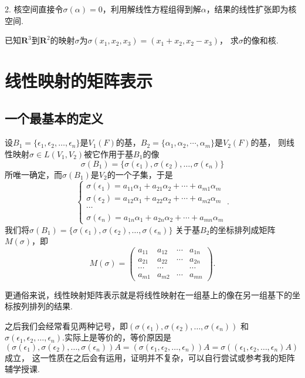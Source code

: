 2. 核空间直接令$\sigma(\alpha)=0$，利用解线性方程组得到解$\alpha$，结果的线性扩张即为核空间.
\begin{example}
	已知$\mathbf{R}^3$到$\mathbf{R}^2$的映射$\sigma$为$\sigma(x_1,x_2,x_3)=(x_1+x_2,x_2-x_3)$，
	求$\sigma$的像和核.
\end{example}

\section{线性映射的矩阵表示}
\subsection{一个最基本的定义}
\begin{definition}
	设$B_1=\{\epsilon_1,\epsilon_2,\dots,\epsilon_n\}$是$V_1(F)$的基，$B_2=\{\alpha_1,\alpha_2,\cdots,\alpha_m\}$是$V_2(F)$的基，
	则线性映射$\sigma \in L(V_1,V_2)$被它作用于基$B_1$的像
	$$\sigma(B_1)=\{\sigma(\epsilon_1),\sigma(\epsilon_2),\dots,\sigma(\epsilon_n)\}$$
	所唯一确定，而$\sigma(B_1)$是$V_2$的一个子集，于是
	$$\begin{cases}
		\sigma(\epsilon_1)=a_{11}\alpha_1+a_{21}\alpha_2+\cdots+a_{m1}\alpha_m \\
		\sigma(\epsilon_2)=a_{12}\alpha_1+a_{22}\alpha_2+\cdots+a_{m2}\alpha_m \\
		\cdots \\
		\sigma(\epsilon_n)=a_{1n}\alpha_1+a_{2n}\alpha_2+\cdots+a_{mn}\alpha_m
	\end{cases}.$$
	我们将$\sigma(B_1)=\{\sigma(\epsilon_1),\sigma(\epsilon_2),\dots,\sigma(\epsilon_n)\}$
	关于基$B_2$的坐标排列成矩阵$M(\sigma)$，即
	$$M(\sigma)=\begin{pmatrix}
		a_{11} & a_{12} & \cdots & a_{1n} \\
		a_{21} & a_{22} & \cdots & a_{2n} \\
		\cdots & \cdots &        & \cdots \\
		a_{m1} & a_{m2} & \cdots & a_{mn}
	\end{pmatrix}.$$
\end{definition}
更通俗来说，线性映射矩阵表示就是将线性映射在一组基上的像在另一组基下的坐标按列排列的结果.

之后我们会经常看见两种记号，即$(\sigma(\epsilon_1),\sigma(\epsilon_2),\dots,\sigma(\epsilon_n))$ 
和$\sigma(\epsilon_1,\epsilon_2,\dots,\epsilon_n)$.实际上是等价的，等价原因是
$(\sigma(\epsilon_1),\sigma(\epsilon_2),\dots,\sigma(\epsilon_n))A=(\sigma(\epsilon_1,\epsilon_2,\dots,\epsilon_n))A=\sigma((\epsilon_1,\epsilon_2,\dots,\epsilon_n)A)$成立，
这一性质在之后会有运用，证明并不复杂，可以自行尝试或参考我的矩阵辅学授课.

